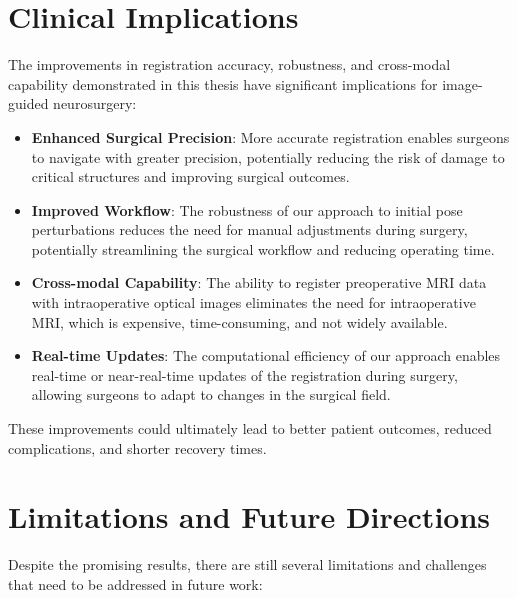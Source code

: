 \section{Clinical Implications}

The improvements in registration accuracy, robustness, and cross-modal capability demonstrated in this thesis have significant implications for image-guided neurosurgery:

\begin{itemize}
    \item \textbf{Enhanced Surgical Precision}: More accurate registration enables surgeons to navigate with greater precision, potentially reducing the risk of damage to critical structures and improving surgical outcomes.
    
    \item \textbf{Improved Workflow}: The robustness of our approach to initial pose perturbations reduces the need for manual adjustments during surgery, potentially streamlining the surgical workflow and reducing operating time.
    
    \item \textbf{Cross-modal Capability}: The ability to register preoperative MRI data with intraoperative optical images eliminates the need for intraoperative MRI, which is expensive, time-consuming, and not widely available.
    
    \item \textbf{Real-time Updates}: The computational efficiency of our approach enables real-time or near-real-time updates of the registration during surgery, allowing surgeons to adapt to changes in the surgical field.
\end{itemize}

These improvements could ultimately lead to better patient outcomes, reduced complications, and shorter recovery times.

\section{Limitations and Future Directions}

Despite the promising results, there are still several limitations and challenges that need to be addressed in future work:

